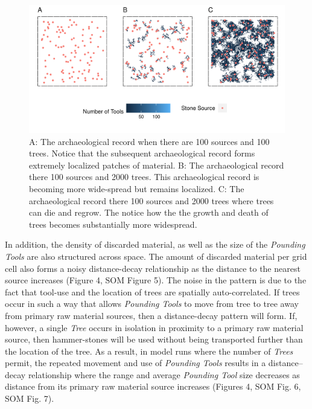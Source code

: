 \documentclass[9pt,twocolumn,twoside,]{pnas-new}
\begin{document}
\begin{figure}

\includegraphics[width=6.5in]{Reeves_et_al_2021_Panda_ABM_files/figure-latex/figure 3-1.pdf}

\caption{A: The archaeological record when there are 100 sources and 100 trees. Notice that the subsequent archaeological record forms extremely localized patches of material. B: The archaeological record there 100 sources and 2000 trees. This archaeological record is becoming more wide-spread but remains localized. C: The archaeological record there 100 sources and 2000 trees where trees can die and regrow. The notice how the the growth and death of trees becomes substantially more widespread.}

\label{distribution}

\end{figure}

In addition, the density of discarded material, as well as the size of
the \emph{Pounding Tools} are also structured across space. The amount
of discarded material per grid cell also forms a noisy distance-decay
relationship as the distance to the nearest source increases (Figure 4,
SOM Figure 5). The noise in the pattern is due to the fact that tool-use
and the location of trees are spatially auto-correlated. If trees occur
in such a way that allows \emph{Pounding Tools} to move from tree to
tree away from primary raw material sources, then a distance-decay
pattern will form. If, however, a single \emph{Tree} occurs in isolation
in proximity to a primary raw material source, then hammer-stones will
be used without being transported further than the location of the tree.
As a result, in model runs where the number of \emph{Trees} permit, the
repeated movement and use of \emph{Pounding Tools} results in a
distance--decay relationship where the range and average \emph{Pounding
Tool} size decreases as distance from its primary raw material source
increases (Figures 4, SOM Fig. 6, SOM Fig. 7).
\end{document}

